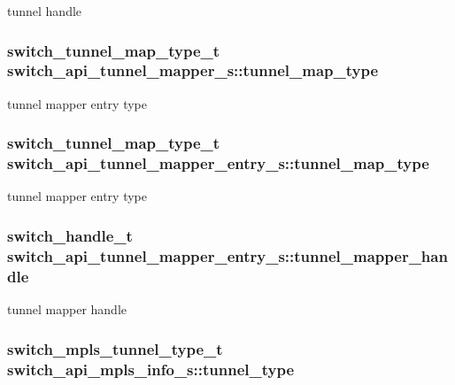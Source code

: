tunnel handle \hypertarget{group__Tunnel_gaabdc00f1db835c1e46b0c8c8054d6d5e}{
\subsubsection[{tunnel\+\_\+map\+\_\+type}]{\setlength{\rightskip}{0pt plus 5cm}switch\+\_\+tunnel\+\_\+map\+\_\+type\+\_\+t switch\+\_\+api\+\_\+tunnel\+\_\+mapper\+\_\+s\+::tunnel\+\_\+map\+\_\+type}}\label{group__Tunnel_gaabdc00f1db835c1e46b0c8c8054d6d5e}
tunnel mapper entry type \hypertarget{group__Tunnel_ga64713ea1034e8583ee43f1d811e03eba}{
\subsubsection[{tunnel\+\_\+map\+\_\+type}]{\setlength{\rightskip}{0pt plus 5cm}switch\+\_\+tunnel\+\_\+map\+\_\+type\+\_\+t switch\+\_\+api\+\_\+tunnel\+\_\+mapper\+\_\+entry\+\_\+s\+::tunnel\+\_\+map\+\_\+type}}\label{group__Tunnel_ga64713ea1034e8583ee43f1d811e03eba}
tunnel mapper entry type \hypertarget{group__Tunnel_ga57c05fa2b7375ae67c1ec2c14e44b4c6}{
\subsubsection[{tunnel\+\_\+mapper\+\_\+handle}]{\setlength{\rightskip}{0pt plus 5cm}switch\+\_\+handle\+\_\+t switch\+\_\+api\+\_\+tunnel\+\_\+mapper\+\_\+entry\+\_\+s\+::tunnel\+\_\+mapper\+\_\+handle}}\label{group__Tunnel_ga57c05fa2b7375ae67c1ec2c14e44b4c6}
tunnel mapper handle \hypertarget{group__Tunnel_ga2f8e73c9ca6cc1282e923f8e3ca982e5}{
\subsubsection[{tunnel\+\_\+type}]{\setlength{\rightskip}{0pt plus 5cm}switch\+\_\+mpls\+\_\+tunnel\+\_\+type\+\_\+t switch\+\_\+api\+\_\+mpls\+\_\+info\+\_\+s\+::tunnel\+\_\+type}}\label{group__Tunnel_ga2f8e73c9ca6cc1282e923f8e3ca982e5}

